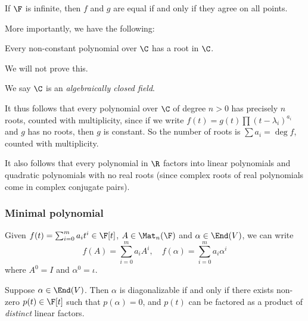 \documentclass[a4paper]{article}
\begin{document}
\begin{cor}
  If $\F$ is infinite, then $f$ and $g$ are equal if and only if they agree on all points.
\end{cor}

More importantly, we have the following:
\begin{thm}
  Every non-constant polynomial over $\C$ has a root in $\C$.
\end{thm}
We will not prove this.

We say $\C$ is an \emph{algebraically closed field}.

It thus follows that every polynomial over $\C$ of degree $n > 0$ has precisely $n$ roots, counted with multiplicity, since if we write $f(t) = g(t)\prod (t - \lambda_i)^{a_i}$ and $g$ has no roots, then $g$ is constant. So the number of roots is $\sum a_i = \deg f$, counted with multiplicity.

It also follows that every polynomial in $\R$ factors into linear polynomials and quadratic polynomials with no real roots (since complex roots of real polynomials come in complex conjugate pairs).

\subsubsection{Minimal polynomial}

\begin{notation}
  Given $f(t) = \sum_{i = 0}^m a_i t^i \in \F[t]$, $A \in \Mat_n(\F)$ and $\alpha \in \End(V)$, we can write
  \[
    f(A) = \sum_{i = 0}^m a_i A^i,\quad f(\alpha) = \sum_{i = 0}^m a_i \alpha^i
  \]
  where $A^0 = I$ and $\alpha^0 = \iota$.
\end{notation}

\begin{thm}
  Suppose $\alpha \in \End(V)$. Then $\alpha$ is diagonalizable if and only if there exists non-zero $p(t) \in \F[t]$ such that $p(\alpha) = 0$, and $p(t)$ can be factored as a product of \emph{distinct} linear factors.
\end{thm}
\end{document}
